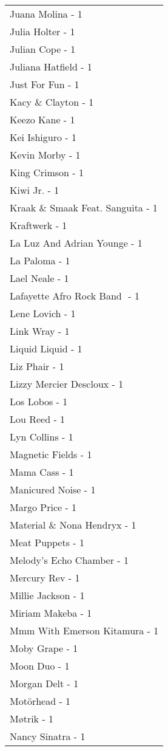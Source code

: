 \documentclass[
]{article}
\begin{document}
\begin{longtable}{l}
Juana Molina - 1 \\ 
Julia Holter - 1 \\ 
Julian Cope - 1 \\ 
Juliana Hatfield - 1 \\ 
Just For Fun - 1 \\ 
Kacy \& Clayton - 1 \\ 
Keezo Kane - 1 \\ 
Kei Ishiguro - 1 \\ 
Kevin Morby - 1 \\ 
King Crimson - 1 \\ 
Kiwi Jr. - 1 \\ 
Kraak \& Smaak Feat. Sanguita - 1 \\ 
Kraftwerk - 1 \\ 
La Luz And Adrian Younge - 1 \\ 
La Paloma - 1 \\ 
Lael Neale - 1 \\ 
Lafayette Afro Rock Band ‎ - 1 \\ 
Lene Lovich - 1 \\ 
Link Wray - 1 \\ 
Liquid Liquid - 1 \\ 
Liz Phair - 1 \\ 
Lizzy Mercier Descloux - 1 \\ 
Los Lobos - 1 \\ 
Lou Reed - 1 \\ 
Lyn Collins - 1 \\ 
Magnetic Fields - 1 \\ 
Mama Cass - 1 \\ 
Manicured Noise - 1 \\ 
Margo Price - 1 \\ 
Material \& Nona Hendryx - 1 \\ 
Meat Puppets - 1 \\ 
Melody's Echo Chamber - 1 \\ 
Mercury Rev - 1 \\ 
Millie Jackson - 1 \\ 
Miriam Makeba - 1 \\ 
Mmm With Emerson Kitamura - 1 \\ 
Moby Grape - 1 \\ 
Moon Duo - 1 \\ 
Morgan Delt - 1 \\ 
Motörhead - 1 \\ 
Møtrik - 1 \\ 
Nancy Sinatra - 1 \\ 

\end{longtable}
\end{document}
